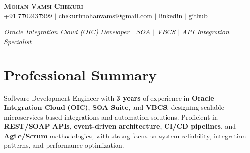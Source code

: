 \documentclass[letterpaper,11pt]{article}
\begin{document}
\begin{center}
    \textbf{\Huge \scshape Mohan Vamsi Chekuri} \\ \vspace{1pt}
    \small +91 7702437999 $|$ \href{mailto:chekurimohanvamsi@gmail.com}{\underline{chekurimohanvamsi@gmail.com}} $|$
    \href{https://www.linkedin.com/in/mvamsi73}{\underline{linkedin}} $|$
    \href{https://github.com}{\underline{github}}
\end{center}

\vspace{-4pt}
\begin{center}
    \small \textit{Oracle Integration Cloud (OIC) Developer $|$ SOA $|$ VBCS $|$ API Integration Specialist}
\end{center}

\section{Professional Summary}
Software Development Engineer with \textbf{3 years} of experience in \textbf{Oracle Integration Cloud (OIC)}, \textbf{SOA Suite}, and \textbf{VBCS}, designing scalable microservices-based integrations and automation solutions. Proficient in \textbf{REST/SOAP APIs}, \textbf{event-driven architecture}, \textbf{CI/CD pipelines}, and \textbf{Agile/Scrum} methodologies, with strong focus on system reliability, integration patterns, and performance optimization.
\end{document}
